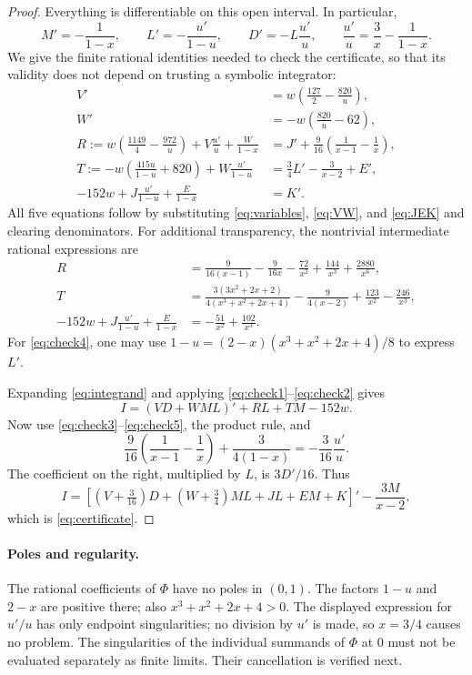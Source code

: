 \documentclass[11pt,a4paper]{article}
\numberwithin{equation}{section}
\begin{document}
\begin{proof}
Everything is differentiable on this open interval. In particular,
\begin{equation}\label{eq:derivatives}
 M'=-\frac1{1-x},\qquad L'=-\frac{u'}{1-u},\qquad
 D'=-L\frac{u'}u,\qquad \frac{u'}u=\frac3x-\frac1{1-x}.
\end{equation}
We give the finite rational identities needed to check the certificate, so that its validity does not depend on trusting a symbolic integrator:
\begin{align}
 V'&=w\left(\frac{127}{2}-\frac{820}{u}\right),\label{eq:check1}\\
 W'&=-w\left(\frac{820}{u}-62\right),\label{eq:check2}\\
 R:=w\left(\frac{1149}{4}-\frac{972}{u}\right)
        +V\frac{u'}u+\frac{W}{1-x}
 &=J'+\frac9{16}\left(\frac1{x-1}-\frac1x\right),\label{eq:check3}\\
 T:=-w\left(\frac{415u}{1-u}+820\right)
          +W\frac{u'}{1-u}
 &=\frac34L'-\frac3{x-2}+E',\label{eq:check4}\\
 -152w+J\frac{u'}{1-u}+\frac{E}{1-x}&=K'.\label{eq:check5}
\end{align}
All five equations follow by substituting \eqref{eq:variables}, \eqref{eq:VW}, and \eqref{eq:JEK} and clearing denominators. For additional transparency, the nontrivial intermediate rational expressions are
\begin{align*}
 R&=\frac9{16(x-1)}-\frac9{16x}-\frac{72}{x^2}
                  +\frac{144}{x^3}+\frac{2880}{x^6},\\
 T&=\frac{3(3x^2+2x+2)}{4(x^3+x^2+2x+4)}
            -\frac9{4(x-2)}+\frac{123}{x^2}-\frac{246}{x^3},\\
 -152w+J\frac{u'}{1-u}+\frac{E}{1-x}
   &=-\frac{51}{x^2}+\frac{102}{x^3}.
\end{align*}
For \eqref{eq:check4}, one may use
$1-u=(2-x)(x^3+x^2+2x+4)/8$ to express $L'$.

Expanding \eqref{eq:integrand} and applying \eqref{eq:check1}--\eqref{eq:check2} gives
\[
 I=(VD+WML)'+RL+TM-152w.
\]
Now use \eqref{eq:check3}--\eqref{eq:check5}, the product rule, and
\[
 \frac9{16}\left(\frac1{x-1}-\frac1x\right)
       +\frac{3}{4(1-x)}=-\frac3{16}\frac{u'}u.
\]
The coefficient on the right, multiplied by $L$, is $3D'/16$. Thus
\[
 I=\left[(V+\tfrac3{16})D+(W+\tfrac34)ML+JL+EM+K\right]'
       -\frac{3M}{x-2},
\]
which is \eqref{eq:certificate}.
\end{proof}

\paragraph{Poles and regularity.}
The rational coefficients of $\Phi$ have no poles in $(0,1)$. The factors $1-u$ and $2-x$ are positive there; also $x^3+x^2+2x+4>0$. The displayed expression for $u'/u$ has only endpoint singularities; no division by $u'$ is made, so $x=3/4$ causes no problem. The singularities of the individual summands of $\Phi$ at $0$ must not be evaluated separately as finite limits. Their cancellation is verified next.
\end{document}
